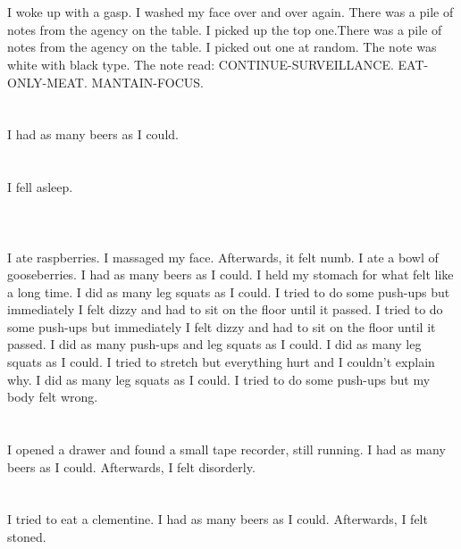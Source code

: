 \documentclass{article}
\begin{document}
    \section{}
    I woke up with a gasp. I washed my face over and over again. There was a pile of notes from the agency on the table. I picked up the top one.There was a pile of notes from the agency on the table. I picked out one at random. The note was white with black type. The note read: CONTINUE-SURVEILLANCE. EAT-ONLY-MEAT. MANTAIN-FOCUS.  
    \newpage
    
    \section{}
    I had as many beers as I could.  
    \newpage
    
    \section{}
    I fell asleep.\\\\ 
    \newpage
    
    \section{}
    I ate raspberries. I massaged my face. Afterwards, it felt numb. I ate a bowl of gooseberries. I had as many beers as I could. I held my stomach for what felt like a long time.  I did as many leg squats as I could.  I tried to do some push-ups but immediately I felt dizzy and had to sit on the floor until it passed.  I tried to do some push-ups but immediately I felt dizzy and had to sit on the floor until it passed.  I did as many push-ups and leg squats as I could.   I did as many leg squats as I could.  I tried to stretch but everything hurt and I couldn't explain why.  I did as many leg squats as I could.  I tried to do some push-ups but my body felt wrong.  
    \newpage
    
    \section{}
    I opened a drawer and found a small tape recorder, still running. I had as many beers as I could. Afterwards, I felt disorderly.  
    \newpage
    
    \section{}
    I tried to eat a clementine. I had as many beers as I could. Afterwards, I felt stoned.  
    \newpage
    
\end{document}
